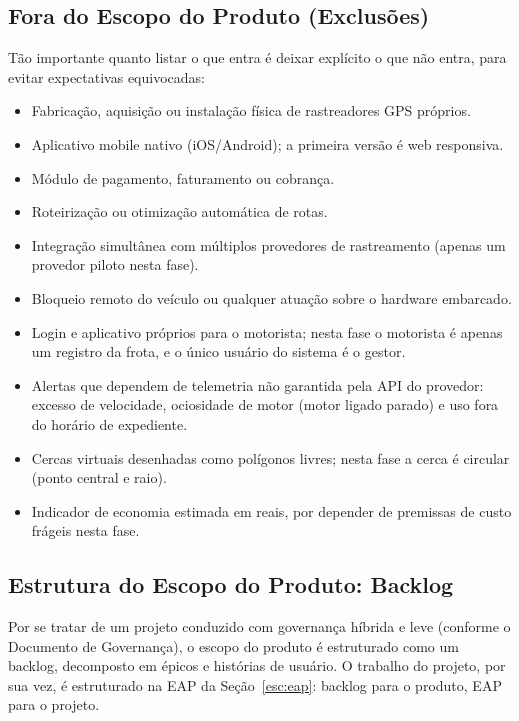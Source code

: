 \documentclass[11pt,a4paper]{article}
\begin{document}
\subsection{Fora do Escopo do Produto (Exclusões)}\label{esc:exclusoes}
Tão importante quanto listar o que entra é deixar explícito o que não entra, para evitar expectativas equivocadas:
\begin{itemize}[itemsep=2pt]
  \item Fabricação, aquisição ou instalação física de rastreadores GPS próprios.
  \item Aplicativo mobile nativo (iOS/Android); a primeira versão é web responsiva.
  \item Módulo de pagamento, faturamento ou cobrança.
  \item Roteirização ou otimização automática de rotas.
  \item Integração simultânea com múltiplos provedores de rastreamento (apenas um provedor piloto nesta fase).
  \item Bloqueio remoto do veículo ou qualquer atuação sobre o hardware embarcado.
  \item Login e aplicativo próprios para o motorista; nesta fase o motorista é apenas um registro da frota, e o único usuário do sistema é o gestor.
  \item Alertas que dependem de telemetria não garantida pela API do provedor: excesso de velocidade, ociosidade de motor (motor ligado parado) e uso fora do horário de expediente.
  \item Cercas virtuais desenhadas como polígonos livres; nesta fase a cerca é circular (ponto central e raio).
  \item Indicador de economia estimada em reais, por depender de premissas de custo frágeis nesta fase.
\end{itemize}

\subsection{Estrutura do Escopo do Produto: Backlog}\label{esc:backlog}
Por se tratar de um projeto conduzido com governança híbrida e leve (conforme o Documento de Governança), o escopo do produto é estruturado como um backlog, decomposto em épicos e histórias de usuário. O trabalho do projeto, por sua vez, é estruturado na EAP da Seção~\ref{esc:eap}: backlog para o produto, EAP para o projeto.
\end{document}
